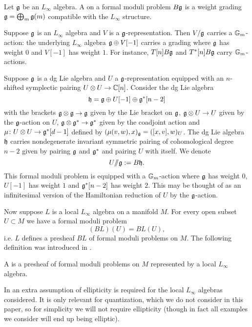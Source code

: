 \documentclass[10pt, oneside]{article}
\begin{document}
\begin{definition}
Let $\mathfrak g$ be an $L_\infty$ algebra. A  on a formal moduli problem $B\mathfrak g$ is a weight grading $\mathfrak g = \bigoplus_m \mathfrak g(m)$ compatible with the $L_\infty$ structure.
\end{definition}

\begin{example}
Suppose $\mathfrak g$ is an $L_\infty$ algebra and $V$ is a $\mathfrak g$-representation. Then $V/\mathfrak g$ carries a $\mathbb{G}_m$-action: the underlying $L_\infty$ algebra $\mathfrak g\oplus V[-1]$ carries a grading where $\mathfrak g$ has weight $0$ and $V[-1]$ has weight $1$. For instance, $T[n] B\mathfrak g$ and $T^*[n] B\mathfrak g$ carry $\mathbb{G}_m$-actions.
\end{example}

\begin{example}
Suppose $\mathfrak g$ is a dg Lie algebra and $U$ a $\mathfrak g$-representation equipped with an $n$-shifted symplectic pairing $U\otimes U\rightarrow \mathbb C[n]$. Consider the dg Lie algebra
\[\mathfrak h = \mathfrak g\oplus U[-1]\oplus \mathfrak g^*[n-2]\]
with the brackets $\mathfrak g\otimes \mathfrak g\rightarrow \mathfrak g$ given by the Lie bracket on $\mathfrak g$, $\mathfrak g\otimes U\rightarrow U$ given by the $\mathfrak g$-action on $U$, $\mathfrak g\otimes \mathfrak g^*\rightarrow \mathfrak g^*$ given by the coadjoint action and $\mu\colon U\otimes U\rightarrow \mathfrak g^*[d-1]$ defined by $(\mu(v, w), x)_\mathfrak g = ([x, v], w)_U$. The dg Lie algebra $\mathfrak h$ carries nondegenerate invariant symmetric pairing of cohomological degree $n-2$ given by pairing $\mathfrak g$ and $\mathfrak g^*$ and pairing $U$ with itself. We denote
\[U/\!\!/ \mathfrak g := B\mathfrak h.\]
This formal moduli problem is equipped with a $\mathbb{G}_m$-action where $\mathfrak g$ has weight 0, $U[-1]$ has weight $1$ and $\mathfrak g^*[n-2]$ has weight $2$. This may be thought of as an infinitesimal version of the Hamiltonian reduction of $U$ by the $\mathfrak g$-action.
\end{example}

Now suppose $L$ is a local $L_\infty$ algebra on a manifold $M$. For every open subset $U\subset M$ we have a formal moduli problem
\[(B L)(U) = B L(U),\]
i.e. $L$ defines a presheaf $B L$ of formal moduli problems on $M$. The following definition was introduced in \cite[Definition 4.1.3.3]{Book2}.

\begin{definition}
A  is a presheaf of formal moduli problems on $M$ represented by a local $L_\infty$ algebra.
\end{definition}

\begin{remark}
In \cite{Book2} an extra assumption of ellipticity is required for the local $L_\infty$ algebras considered. It is only relevant for quantization, which we do not consider in this paper, so for simplicity we will not require ellipticity (though in fact all examples we consider will end up being elliptic).
\end{remark}
\end{document}
